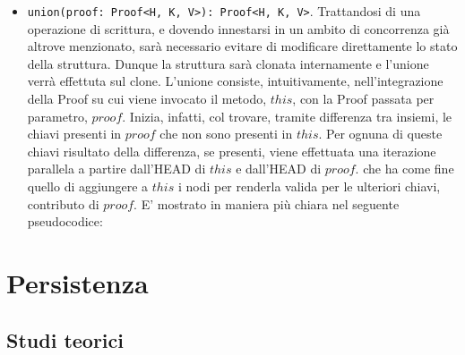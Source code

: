 \begin{itemize}
			\item \verb|union(proof: Proof<H, K, V>): Proof<H, K, V>|. Trattandosi di una operazione di scrittura, e dovendo innestarsi in un ambito di concorrenza già altrove menzionato, sarà necessario evitare di modificare direttamente lo stato della struttura. Dunque la struttura sarà clonata internamente e l'unione verrà effettuta sul clone. L'unione consiste, intuitivamente, nell'integrazione della Proof su cui viene invocato il metodo, $ this $, con la Proof passata per parametro, $ proof $. Inizia, infatti, col trovare, tramite differenza tra insiemi, le chiavi presenti in $ proof $ che non sono presenti in $ this $. Per ognuna di queste chiavi risultato della differenza, se presenti, viene effettuata una iterazione parallela a partire dall'HEAD di $ this $ e dall'HEAD di $ proof $. che ha come fine quello di aggiungere a $ this $ i nodi per renderla valida per le ulteriori chiavi, contributo di $ proof $. E' mostrato in maniera più chiara nel seguente pseudocodice:
			
			\begin{algorithm}[H]
			\end{algorithm}
			
			
		\end{itemize}








	
\section{Persistenza}

%	
		
	\subsection{Studi teorici}
		
